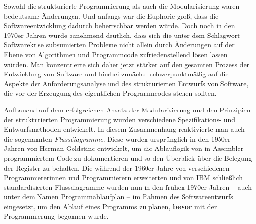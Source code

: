 
Sowohl die strukturierte Programmierung als auch die Modularisierung waren bedeutsame Änderungen. Und anfangs war die Euphorie groß, dass die Softwareentwicklung dadurch beherrschbar werden würde. Doch noch in den 1970er Jahren wurde zunehmend deutlich, dass sich die unter dem Schlagwort Softwarekrise subsumierten Probleme nicht allein durch Änderungen auf der Ebene von Algorithmen und Programmcode zufriedenstellend lösen lassen würden. Man konzentrierte sich daher jetzt stärker auf den gesamten Prozess der Entwicklung von Software und hierbei zunächst schwerpunktmäßig auf die Aspekte der Anforderungsanalyse und des strukturierten Entwurfs von Software, die vor der Erzeugung des eigentlichen Programmcodes stehen sollten.

Aufbauend auf dem erfolgreichen Ansatz der Modularisierung und den Prinzipien der strukturierten Programmierung wurden verschiedene Spezifikations- und Entwurfsmethoden entwickelt. In diesem Zusammenhang reaktivierte man auch die sogenannten \textit{Flussdiagramme}.
Diese wurden ursprünglich in den 1950er Jahren von Herman Goldstine entwickelt, um die Ablauflogik von in Assembler programmiertem Code zu dokumentieren und so den Überblick über die Belegung der Register zu behalten. Die während der 1960er Jahre von verschiedenen Programmiererinnen und Programmierern erweiterten und von IBM schließlich standardisierten Flussdiagramme wurden  nun in den frühen 1970er Jahren – auch unter dem Namen Programmablaufplan – im Rahmen des Softwareentwurfs eingesetzt, um den Ablauf eines Programms zu planen, \textbf{bevor} mit der Programmierung begonnen wurde.

